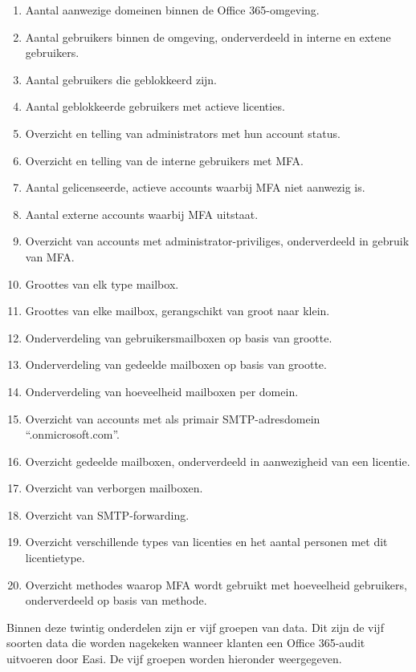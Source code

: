 \begin{enumerate}
    \item Aantal aanwezige domeinen binnen de Office 365-omgeving.
    \item Aantal gebruikers binnen de omgeving, onderverdeeld in interne
    en extene gebruikers.
    \item Aantal gebruikers die geblokkeerd zijn.
    \item Aantal geblokkeerde gebruikers met actieve licenties.
    \item Overzicht en telling van administrators met hun account status.
    \item Overzicht en telling van de interne gebruikers met \ac{MFA}.
    \item Aantal gelicenseerde, actieve accounts waarbij \ac{MFA} niet aanwezig is.
    \item Aantal externe accounts waarbij \ac{MFA} uitstaat.
    \item Overzicht van accounts met administrator-priviliges,
    onderverdeeld in gebruik van \ac{MFA}.
    \item Groottes van elk type mailbox.
    \item Groottes van elke mailbox, gerangschikt van groot naar klein.
    \item Onderverdeling van gebruikersmailboxen op basis van grootte.
    \item Onderverdeling van gedeelde mailboxen op basis van grootte.
    \item Onderverdeling van hoeveelheid mailboxen per domein.
    \item Overzicht van accounts met als primair \Ac{SMTP}-adresdomein “.onmicrosoft.com”.
    \item Overzicht gedeelde mailboxen, onderverdeeld in aanwezigheid van een licentie.
    \item Overzicht van verborgen mailboxen.
    \item Overzicht van \ac{SMTP}-forwarding.
    \item Overzicht verschillende types van licenties en het aantal personen met dit licentietype.
    \item Overzicht methodes waarop \ac{MFA} wordt gebruikt met hoeveelheid gebruikers, onderverdeeld op basis van methode.
\end{enumerate}

Binnen deze twintig onderdelen zijn er vijf groepen van data. Dit zijn de vijf soorten data die worden nagekeken wanneer klanten een Office 365-audit uitvoeren door Easi. De vijf groepen worden hieronder weergegeven. 

